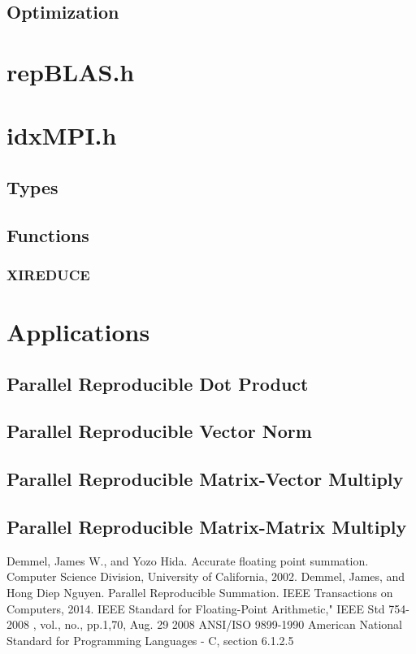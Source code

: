 \documentclass[12pt]{article}
\theoremstyle{plain}
\begin{document}
  \subsection{Optimization}
\section{repBLAS.h}
\section{idxMPI.h}
  \subsection{Types}
  \subsection{Functions}
    \subsubsection{XIREDUCE}
\section{Applications}
  \subsection{Parallel Reproducible Dot Product}
  \subsection{Parallel Reproducible Vector Norm}
  \subsection{Parallel Reproducible Matrix-Vector Multiply}
  \subsection{Parallel Reproducible Matrix-Matrix Multiply}
\begin{thebibliography}{9}
    Demmel, James W., and Yozo Hida. Accurate floating point summation. Computer Science Division, University of California, 2002.
    Demmel, James, and Hong Diep Nguyen. Parallel Reproducible Summation. IEEE Transactions on Computers, 2014.
    IEEE Standard for Floating-Point Arithmetic," IEEE Std 754-2008 , vol., no., pp.1,70, Aug. 29 2008
    ANSI/ISO 9899-1990 American National Standard for Programming Languages - C, section 6.1.2.5
\end{thebibliography}
\end{document}
